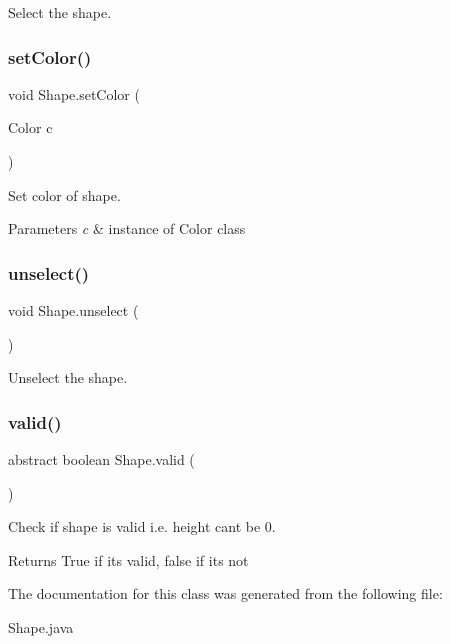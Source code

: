 Select the shape. \mbox{\label{class_shape_a49e29c1da103be18d279993034de99c6}} 
\subsubsection{\texorpdfstring{set\+Color()}{setColor()}}
{\footnotesize\ttfamily void Shape.\+set\+Color (\begin{DoxyParamCaption}\item[{Color}]{c }\end{DoxyParamCaption})}

Set color of shape. 
\begin{DoxyParams}{Parameters}
{\em c} & instance of Color class \\
\hline
\end{DoxyParams}
\mbox{\label{class_shape_a5fda5181466313db27d010bbf7bb50a4}} 
\subsubsection{\texorpdfstring{unselect()}{unselect()}}
{\footnotesize\ttfamily void Shape.\+unselect (\begin{DoxyParamCaption}{ }\end{DoxyParamCaption})}

Unselect the shape. \mbox{\label{class_shape_a8b64c43dfba956f5586336c460735e1d}} 
\subsubsection{\texorpdfstring{valid()}{valid()}}
{\footnotesize\ttfamily abstract boolean Shape.\+valid (\begin{DoxyParamCaption}{ }\end{DoxyParamCaption})\hspace{0.3cm}{\ttfamily [abstract]}}

Check if shape is valid i.\+e. height can\textquotesingle{}t be 0. \begin{DoxyReturn}{Returns}
True if it\textquotesingle{}s valid, false if it\textquotesingle{}s not 
\end{DoxyReturn}


The documentation for this class was generated from the following file\+:\begin{DoxyCompactItemize}
\item 
Shape.\+java\end{DoxyCompactItemize}
